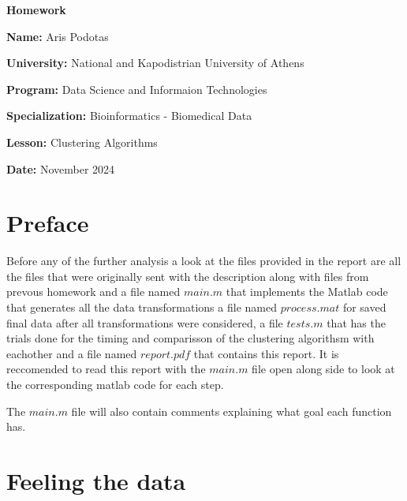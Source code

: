 \documentclass[12pt, a4paper]{article}
\begin{document}
\begin{titlepage}
    \centering
    {\huge \textbf{Homework}\par}
    \vspace{0.5cm}
    {\Large \textbf{Name:} Aris Podotas\par}
    \vspace{0.5cm}
    {\large \textbf{University:} National and Kapodistrian University of Athens\par}
    \vspace{0.5cm}
    {\large \textbf{Program:} Data Science and Informaion Technologies\par}
    \vspace{0.5cm}
    {\large \textbf{Specialization:} Bioinformatics - Biomedical Data\par}
    \vspace{0.5cm}
    {\large \textbf{Lesson:} Clustering Algorithms \par}
    \vspace{0.5cm}
    {\large \textbf{Date:} November 2024\par}
    \tableofcontents
\end{titlepage}

\section{Preface}

Before any of the further analysis a look at the files provided in the report are all the files that were originally sent with the description along with files from prevous homework and a file named $main.m$ that implements the Matlab code that generates all the data transformations a file named $process.mat$ for saved final data after all transformations were considered, a file $tests.m$ that has the trials done for the timing and comparisson of the clustering algorithsm with eachother and a file named $report.pdf$ that contains this report. It is reccomended to read this report with the $main.m$ file open along side to look at the corresponding matlab code for each step.
\newline

The $main.m$ file will also contain comments explaining what goal each function has.

\section{Feeling the data}
\end{document}
